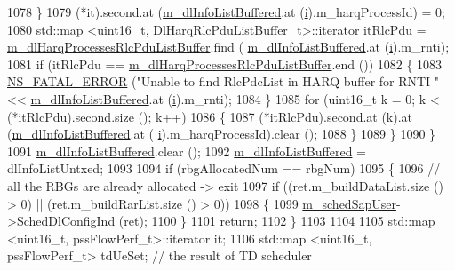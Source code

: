 \begin{DoxyCode}
1078             \}
1079           (*it).second.at (\hyperlink{classns3_1_1PssFfMacScheduler_a3a7d9c7460c66767201d15a1d6f58758}{m\_dlInfoListBuffered}.at (\hyperlink{bernuolliDistribution_8m_a6f6ccfcf58b31cb6412107d9d5281426}{i}).m\_harqProcessId) = 0;
1080           std::map <uint16\_t, DlHarqRlcPduListBuffer\_t>::iterator itRlcPdu =  
      \hyperlink{classns3_1_1PssFfMacScheduler_a0f31f16c2a9f067c6189462a9797e06b}{m\_dlHarqProcessesRlcPduListBuffer}.find (
      \hyperlink{classns3_1_1PssFfMacScheduler_a3a7d9c7460c66767201d15a1d6f58758}{m\_dlInfoListBuffered}.at (\hyperlink{bernuolliDistribution_8m_a6f6ccfcf58b31cb6412107d9d5281426}{i}).m\_rnti);
1081           \textcolor{keywordflow}{if} (itRlcPdu == \hyperlink{classns3_1_1PssFfMacScheduler_a0f31f16c2a9f067c6189462a9797e06b}{m\_dlHarqProcessesRlcPduListBuffer}.end ())
1082             \{
1083               \hyperlink{group__fatal_ga5131d5e3f75d7d4cbfd706ac456fdc85}{NS\_FATAL\_ERROR} (\textcolor{stringliteral}{"Unable to find RlcPdcList in HARQ buffer for RNTI "} << 
      \hyperlink{classns3_1_1PssFfMacScheduler_a3a7d9c7460c66767201d15a1d6f58758}{m\_dlInfoListBuffered}.at (\hyperlink{bernuolliDistribution_8m_a6f6ccfcf58b31cb6412107d9d5281426}{i}).m\_rnti);
1084             \}
1085           \textcolor{keywordflow}{for} (uint16\_t k = 0; k < (*itRlcPdu).second.size (); k++)
1086             \{
1087               (*itRlcPdu).second.at (k).at (\hyperlink{classns3_1_1PssFfMacScheduler_a3a7d9c7460c66767201d15a1d6f58758}{m\_dlInfoListBuffered}.at (
      \hyperlink{bernuolliDistribution_8m_a6f6ccfcf58b31cb6412107d9d5281426}{i}).m\_harqProcessId).clear ();
1088             \}
1089         \}
1090     \}
1091   \hyperlink{classns3_1_1PssFfMacScheduler_a3a7d9c7460c66767201d15a1d6f58758}{m\_dlInfoListBuffered}.clear ();
1092   \hyperlink{classns3_1_1PssFfMacScheduler_a3a7d9c7460c66767201d15a1d6f58758}{m\_dlInfoListBuffered} = dlInfoListUntxed;
1093 
1094   \textcolor{keywordflow}{if} (rbgAllocatedNum == rbgNum)
1095     \{
1096       \textcolor{comment}{// all the RBGs are already allocated -> exit}
1097       \textcolor{keywordflow}{if} ((ret.m\_buildDataList.size () > 0) || (ret.m\_buildRarList.size () > 0))
1098         \{
1099           \hyperlink{classns3_1_1PssFfMacScheduler_aef80e10798607daea4efdf4cf1297bd9}{m\_schedSapUser}->\hyperlink{classns3_1_1FfMacSchedSapUser_a28f8484af5a32a45ee6c0e51770d83f7}{SchedDlConfigInd} (ret);
1100         \}
1101       \textcolor{keywordflow}{return};
1102     \}
1103 
1104 
1105   std::map <uint16\_t, pssFlowPerf\_t>::iterator it;
1106   std::map <uint16\_t, pssFlowPerf\_t> tdUeSet; \textcolor{comment}{// the result of TD scheduler}

\end{DoxyCode}
